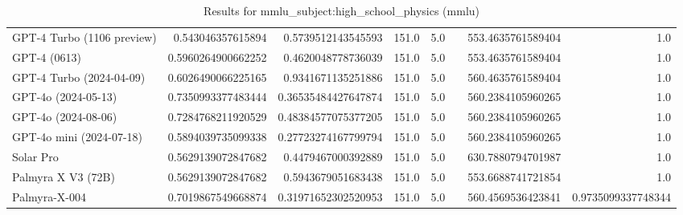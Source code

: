 \begin{table}[htp]
{\begin{tabular}{lrrrrrrr}
GPT-4 Turbo (1106 preview) & 0.543046357615894 & 0.5739512143545593 & 151.0 & 5.0 &  & 553.4635761589404 & 1.0 \\
GPT-4 (0613) & 0.5960264900662252 & 0.4620048778736039 & 151.0 & 5.0 &  & 553.4635761589404 & 1.0 \\
GPT-4 Turbo (2024-04-09) & 0.6026490066225165 & 0.9341671135251886 & 151.0 & 5.0 &  & 560.4635761589404 & 1.0 \\
GPT-4o (2024-05-13) & 0.7350993377483444 & 0.36535484427647874 & 151.0 & 5.0 &  & 560.2384105960265 & 1.0 \\
GPT-4o (2024-08-06) & 0.7284768211920529 & 0.48384577075377205 & 151.0 & 5.0 &  & 560.2384105960265 & 1.0 \\
GPT-4o mini (2024-07-18) & 0.5894039735099338 & 0.27723274167799794 & 151.0 & 5.0 &  & 560.2384105960265 & 1.0 \\
Solar Pro & 0.5629139072847682 & 0.4479467000392889 & 151.0 & 5.0 &  & 630.7880794701987 & 1.0 \\
Palmyra X V3 (72B) & 0.5629139072847682 & 0.5943679051683438 & 151.0 & 5.0 &  & 553.6688741721854 & 1.0 \\
Palmyra-X-004 & 0.7019867549668874 & 0.31971652302520953 & 151.0 & 5.0 &  & 560.4569536423841 & 0.9735099337748344 \\
\bottomrule
\end{tabular}}
\caption{Results for mmlu_subject:high_school_physics (mmlu)}
\label{fig:mmlu_subject:high_school_physics (mmlu)}
\end{table}